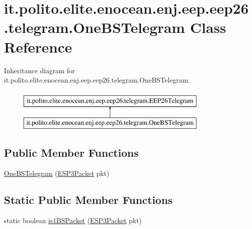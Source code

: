 \hypertarget{classit_1_1polito_1_1elite_1_1enocean_1_1enj_1_1eep_1_1eep26_1_1telegram_1_1_one_b_s_telegram}{}\section{it.\+polito.\+elite.\+enocean.\+enj.\+eep.\+eep26.\+telegram.\+One\+B\+S\+Telegram Class Reference}
\label{classit_1_1polito_1_1elite_1_1enocean_1_1enj_1_1eep_1_1eep26_1_1telegram_1_1_one_b_s_telegram}
Inheritance diagram for it.\+polito.\+elite.\+enocean.\+enj.\+eep.\+eep26.\+telegram.\+One\+B\+S\+Telegram\+:\begin{figure}[H]
\begin{center}
\leavevmode
\includegraphics[height=2.000000cm]{classit_1_1polito_1_1elite_1_1enocean_1_1enj_1_1eep_1_1eep26_1_1telegram_1_1_one_b_s_telegram}
\end{center}
\end{figure}
\subsection*{Public Member Functions}
\begin{DoxyCompactItemize}
\item 
\hyperlink{classit_1_1polito_1_1elite_1_1enocean_1_1enj_1_1eep_1_1eep26_1_1telegram_1_1_one_b_s_telegram_a165137b27e036ceb182b0feaee86747a}{One\+B\+S\+Telegram} (\hyperlink{classit_1_1polito_1_1elite_1_1enocean_1_1protocol_1_1serial_1_1v3_1_1network_1_1packet_1_1_e_s_p3_packet}{E\+S\+P3\+Packet} pkt)
\end{DoxyCompactItemize}
\subsection*{Static Public Member Functions}
\begin{DoxyCompactItemize}
\item 
static boolean \hyperlink{classit_1_1polito_1_1elite_1_1enocean_1_1enj_1_1eep_1_1eep26_1_1telegram_1_1_one_b_s_telegram_a50662d53c49601d88b3a0cb831b48bd5}{is1\+B\+S\+Packet} (\hyperlink{classit_1_1polito_1_1elite_1_1enocean_1_1protocol_1_1serial_1_1v3_1_1network_1_1packet_1_1_e_s_p3_packet}{E\+S\+P3\+Packet} pkt)
\end{DoxyCompactItemize}
